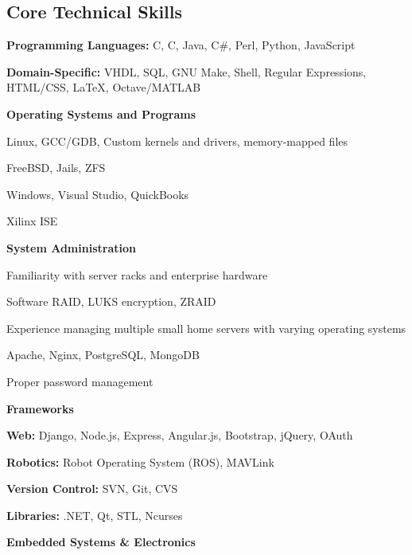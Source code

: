 \documentclass[10pt,letterpaper]{article}
\newcommand{\CPP}
{C\nolinebreak[4]\hspace{-.05em}\raisebox{.22ex}{\footnotesize\bf ++}}
\begin{document}
\subsection*{Core Technical Skills}
\begin{itemize*}
    \item \textbf{Programming Languages:} C, \CPP, Java, C\#, Perl, Python, JavaScript
    \item \textbf{Domain-Specific:} VHDL, SQL, GNU Make, Shell, Regular Expressions, HTML/CSS, \LaTeX, Octave/MATLAB
    \item \textbf{Operating Systems and Programs}
        \begin{itemize*}
            \item Linux, GCC/GDB, Custom kernels and drivers, memory-mapped files
            \item FreeBSD, Jails, ZFS
            \item Windows, Visual Studio, QuickBooks
            \item Xilinx ISE
        \end{itemize*}
    \item \textbf{System Administration}
        \begin{itemize*}
            \item Familiarity with server racks and enterprise hardware
            \item Software RAID, LUKS encryption, ZRAID
            \item Experience managing multiple small home servers with varying operating systems
            \item Apache, Nginx, PostgreSQL, MongoDB
            \item Proper password management
        \end{itemize*}
    \item \textbf{Frameworks}
        \begin{itemize*}
            \item \textbf{Web:} Django, Node.js, Express, Angular.js, Bootstrap, jQuery, OAuth
            \item \textbf{Robotics:} Robot Operating System (ROS), MAVLink
            \item \textbf{Version Control:} SVN, Git, CVS
            \item \textbf{Libraries:} .NET, Qt, STL, Ncurses
        \end{itemize*}
    \item \textbf{Embedded Systems \& Electronics}
        \begin{itemize*}

\end{itemize*}
\end{itemize*}
\end{document}
